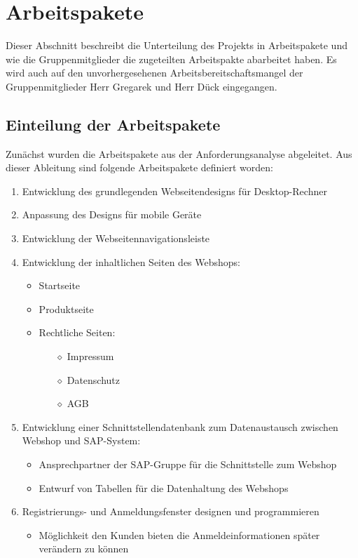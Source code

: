 \newpage
\section{Arbeitspakete}
Dieser Abschnitt beschreibt die Unterteilung des Projekts in Arbeitspakete und wie die Gruppenmitglieder die zugeteilten Arbeitspakte abarbeitet haben. Es wird auch auf den unvorhergesehenen Arbeitsbereitschaftsmangel der Gruppenmitglieder Herr Gregarek und Herr Dück eingegangen.

\subsection{Einteilung der Arbeitspakete}
Zunächst wurden die Arbeitspakete aus der Anforderungsanalyse abgeleitet. Aus dieser Ableitung sind folgende Arbeitspakete definiert worden:
\begin{enumerate}
	\item Entwicklung des grundlegenden Webseitendesigns für Desktop-Rechner
	\item Anpassung des Designs für mobile Geräte
	\item Entwicklung der Webseitennavigationsleiste
	\item Entwicklung der inhaltlichen Seiten des Webshops:
	\begin{itemize}
		\item Startseite
		\item Produktseite
		\item Rechtliche Seiten:
		\begin{itemize}
			\item[$\diamond$] Impressum
			\item[$\diamond$] Datenschutz
			\item[$\diamond$] AGB
		\end{itemize}
	\end{itemize}
	\item Entwicklung einer Schnittstellendatenbank zum Datenaustausch zwischen Webshop und SAP-System:
	\begin{itemize}
		\item Ansprechpartner der SAP-Gruppe für die Schnittstelle zum Webshop
		\item Entwurf von Tabellen für die Datenhaltung des Webshops 
	\end{itemize}
	\item Registrierungs- und Anmeldungsfenster designen und programmieren
	\begin{itemize}
		\item Möglichkeit den Kunden bieten die Anmeldeinformationen später verändern zu können

\end{itemize}
\end{enumerate}
